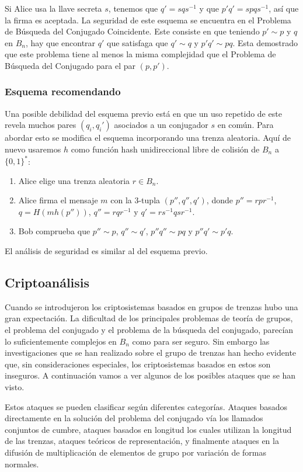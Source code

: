 \documentclass[12pt]{article}
\theoremstyle{definition}
\begin{document}
Si Alice usa la llave secreta $s$, tenemos que $q'=sqs^{-1}$ y que $p'q'=spqs^{-1}$, así que la firma es aceptada. La seguridad de este esquema se encuentra en el Problema de Búsqueda del Conjugado Coincidente. Este consiste en que teniendo $p'\sim p$ y $q$ en $B_n$, hay que encontrar $q'$ que satisfaga que $q'\sim q$ y $p'q'\sim pq$. Esta demostrado que este problema tiene al menos la misma complejidad que el Problema de Búsqueda del Conjugado para el par $(p,p')$.

\subsubsection*{Esquema recomendando}
Una posible debilidad del esquema previo está en que un uso repetido de este revela muchos pares $(q_i,q_i')$ asociados a un conjugador $s$ en común. Para abordar esto se modifica el esquema incorporando una trenza aleatoria. Aquí de nuevo usaremos $h$ como función hash unidireccional libre de colisión de $B_n$ a $\{0,1\}^*$:

\begin{enumerate}
\item Alice elige una trenza aleatoria $r\in B_n$.
\item Alice firma el mensaje $m$ con la 3-tupla $(p'',q'',q')$, donde $p''=rpr^{-1}$, $q=H(mh(p''))$, $q''=rqr^{-1}$ y $q'=rs^{-1}qsr^{-1}$.
\item Bob comprueba que $p''\sim p$, $q''\sim q'$, $p''q''\sim pq$ y $p''q'\sim p'q$.
\end{enumerate}

El análisis de seguridad es similar al del esquema previo.

\subsection{Criptoanálisis}

Cuando se introdujeron los criptosistemas basados en grupos de trenzas hubo una gran expectación. La dificultad de los principales problemas de teoría de grupos, el problema del conjugado y el problema de la búsqueda del conjugado, parecían lo suficientemente complejos en $B_n$ como para ser seguro. Sin embargo las investigaciones que se han realizado sobre el grupo de trenzas han hecho evidente que, sin consideraciones especiales, los criptosistemas basados en estos son inseguros. A continuación vamos a ver algunos de los posibles ataques que se han visto.

Estos ataques se pueden clasificar según diferentes categorías. Ataques basados directamente en la solución del problema del conjugado vía los llamados conjuntos de cumbre, ataques basados en longitud los cuales utilizan la longitud de las trenzas, ataques teóricos de representación, y finalmente ataques en la difusión de multiplicación de elementos de grupo por variación de formas normales.
\end{document}
